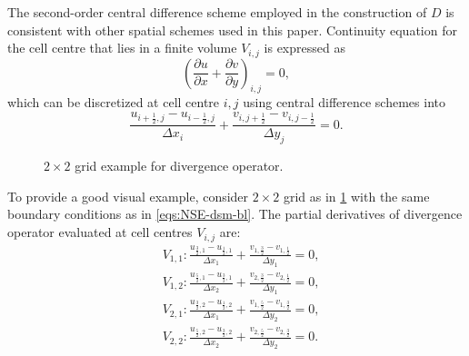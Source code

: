 \documentclass{article}
\numberwithin{equation}{section}
\begin{document}
The second-order central difference scheme employed in the construction of $D$ is consistent with other spatial schemes used in this paper. Continuity equation for the cell centre that lies in a finite volume $V_{i,j}$ is expressed as
\begin{equation*}
	\left(\frac{\partial u}{\partial x} + \frac{\partial v}{\partial y}\right)_{i,j}=0,
\end{equation*}
which can be discretized at cell centre $i,j$ using central difference schemes into
\begin{equation*}
  \frac{u_{i+\frac{1}{2},j} - u_{i-\frac{1}{2},j}}{\Delta x_i}+  \frac{v_{i,j+\frac{1}{2}} - v_{i,j-\frac{1}{2}}}{\Delta y_j}=0.
\end{equation*}

\begin{figure}[H] %
  \caption{$2\times 2$ grid example for divergence operator.}\label{fig:D-example-2x2}
\end{figure}

To provide a good visual example, consider $2 \times 2$ grid as in \cref{fig:D-example-2x2} with the same boundary conditions as in \cref{eqs:NSE-dsm-bl}. The partial derivatives of divergence operator evaluated at cell centres $V_{i,j}$ are: 
$$
\begin{aligned}
& V_{1,1}: \frac{u_{\frac{3}{2},1}-u_{\frac{1}{2},1}}{\Delta x_1}+\frac{v_{1,\frac{3}{2}}-v_{1,\frac{1}{2}}}{\Delta y_1}=0, \\
& V_{1,2}: \frac{u_{\frac{5}{2},1}-u_{\frac{3}{2},1}}{\Delta x_2}+\frac{v_{2,\frac{3}{2}}-v_{2,\frac{1}{2}}}{\Delta y_1}=0, \\
& V_{2,1}: \frac{u_{\frac{3}{2},2}-u_{\frac{1}{2},2}}{\Delta x_1}+\frac{v_{1,\frac{5}{2}}-v_{1,\frac{3}{2}}}{\Delta y_2}=0, \\
& V_{2,2}: \frac{u_{\frac{5}{2},2}-u_{\frac{3}{2},2}}{\Delta x_2}+\frac{v_{2,\frac{5}{2}}-v_{2,\frac{3}{2}}}{\Delta y_2}=0 .
\end{aligned}
$$
\end{document}
